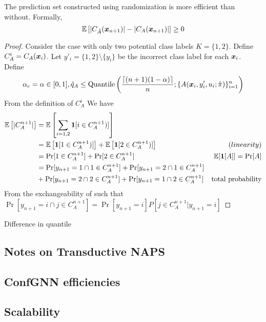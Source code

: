 \begin{theorem}
The prediction set constructed using randomization is more efficient than without. Formally, 
\[
    \mathbb{E}\left[|C_{\Tilde{A}}({\bm{x}}_{n+1})| - |C_A({\bm{x}}_{n+1})|\right]  \geq 0
\]   
\label{them:APS:efficiency}
\end{theorem}
\begin{proof}
Consider the case with only two potential class labels $K = \{1, 2\}$. 
Define $C_{A}^{i} = C_{A}({\bm{x}}_{i})$. 
Let $y'_i = \{1, 2\} \setminus \{y_i\}$ be the incorrect class label for each ${\bm{x}}_i$.
Define 
\[
    \alpha_c = \alpha \in [0, 1], \hat{q}_A \leq \text{Quantile}\left( \frac{\lceil(n+1)(1 - \alpha)\rceil}{n}; \{A({\bm{x}}_i, y'_i, u_i; \hat{\pi})\}_{i=1}^n \right)
\]    
From the definition of $C_A^i$
We have
\begin{align*}
    \mathbb{E}\left[|C_{A}^{n+1}|\right] &= \mathbb{E}\left[\sum\limits_{i=1, 2}\bm{1}[i \in C_{A}^{n+1})]\right] \\
                                 &= \mathbb{E}\left[\bm{1}[1 \in C_{A}^{n+1})]\right] + \mathbb{E}\left[\bm{1}[2 \in C_{A}^{n+1})]\right]  & \text(linearity)\\
                                 &= \Pr[1 \in C_{A}^{n+1}] + \Pr[2 \in C_{A}^{n+1}] & \text{$\mathbb{E}[\bm{1}[A]] = \Pr[A]$}\\
                                 &= \Pr[y_{n+1} = 1 \cap 1 \in C_{A}^{n+1}] + \Pr[y_{n+1} = 2 \cap 1 \in C_{A}^{n+1}] \\
                                 &+ \Pr[y_{n+1} = 2 \cap 2 \in C_{A}^{n+1}] + \Pr[y_{n+1} = 1 \cap 2 \in C_{A}^{n+1}] & \text{total probability}\\
\end{align*}
From the exchangeability of 
such that 
$\Pr[y_{n+1}=i \cap j \in C_{A}^{n+1}] = \Pr[y_{n+1}=i]P[j \in C_{A}^{n+1} | y_{n+1} = i]$

\end{proof}

\begin{theorem}
    Difference in quantile
\end{theorem}






\subsection{Notes on Transductive NAPS}


\subsection{ConfGNN efficiencies}


\subsection{Scalability}